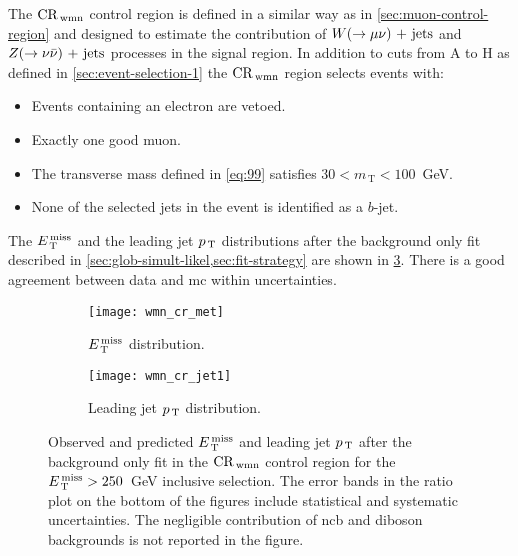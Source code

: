 The $\mathrm{CR}_\mathrm{\, wmn}$ control region is defined in a similar way as in
\cref{sec:muon-control-region} and designed to estimate the contribution of
$W (\rightarrow \mu \nu)\mathrm{~+~jets}$ and $Z (\rightarrow \nu \bar{\nu})\mathrm{~+~jets}$ processes in the signal region. In
addition to cuts from A to H as defined in \ref{sec:event-selection-1} the
$\mathrm{CR}_\mathrm{\, wmn}$ region selects events with:
\begin{itemize}
\item Events containing an electron are vetoed.
\item Exactly one good muon.
\item The transverse mass defined in \eqref{eq:99} satisfies
  $30 < m_\mathrm{\, T} < 100$~GeV.
\item None of the selected jets in the event is identified as a $b$-jet.
\end{itemize}
The $E_\mathrm{\, T}^\mathrm{\, miss}$ and the leading jet $p_\mathrm{\, T}$ distributions after the background only fit
described in \cref{sec:glob-simult-likel,sec:fit-strategy} are shown in
\cref{fig:wmn_plots}. There is a good agreement between data and \gls{mc} within
uncertainties.
\begin{figure}[!th]
  \centering
  \begin{subfigure}[t]{.48\linewidth}
    \texttt{[image: wmn\_cr\_met]}
    \caption{$E_\mathrm{\, T}^\mathrm{\, miss}$ distribution.}
    \label{fig:wmn_cr_et_miss}
  \end{subfigure}
  \begin{subfigure}[t]{.48\linewidth}
    \texttt{[image: wmn\_cr\_jet1]}
    \caption{Leading jet $p_\mathrm{\, T}$ distribution.}
    \label{fig:wmn_cr_jet1}
  \end{subfigure}
  \caption{Observed and predicted $E_\mathrm{\, T}^\mathrm{\, miss}$ and leading jet $p_\mathrm{\, T}$ after the
    background only fit in the $\mathrm{CR}_\mathrm{\, wmn}$ control region for the $E_\mathrm{\, T}^\mathrm{\, miss} > 250$~GeV
    inclusive selection. The error bands in the ratio plot on the bottom of the
    figures include statistical and systematic uncertainties. The negligible
    contribution of \gls{ncb} and diboson backgrounds is not reported in the
    figure.}
  \label{fig:wmn_plots}
\end{figure}

